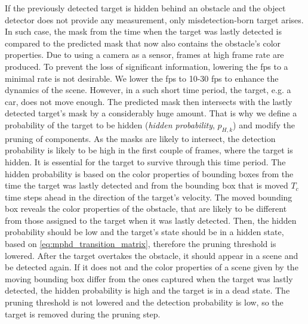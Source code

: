 If the previously detected target is hidden behind an obstacle and the object detector does not provide any
measurement, only misdetection-born target arises. In such case, the mask from the time when the target was lastly
detected is compared to the predicted mask that now also contains the obstacle's color properties. Due to using
a camera as
a sensor, frames at high frame rate are produced. To prevent the loss of significant information, lowering the fps to a minimal rate is not desirable. We lower the fps to 10-30 fps to enhance the dynamics of the scene. However, in a such short time
period, the target, e.g. a car, does not move enough. The predicted mask then intersects with the lastly
detected target's mask by a considerably huge amount. That is why we define \linebreak a probability of the target to be hidden (\textit{hidden probability}, $p_{H,k}$) and modify
the pruning of components. As the masks are likely to intersect, the detection probability is likely to be high in
the first couple of frames, where the target is hidden. It is essential for the target to survive through this time
period. The hidden probability is based on the color properties of bounding boxes from the time the target was lastly
detected
and from the bounding box that is moved $T_c$ time steps ahead in the direction of the target's velocity. The moved
bounding box reveals the color properties of the obstacle, that are likely to be different from those assigned to the
target
when it was lastly detected. Then, the hidden probability should be low and the target's state should be in a hidden
state,
based on \eqref{eq:mphd_transition_matrix}, therefore the pruning threshold is lowered. After the target overtakes the
obstacle,
it should appear in a scene and be detected again. If it does not and the color properties of a scene given by the
moving
bounding box differ from the ones captured when the target was lastly detected, the hidden probability is high and the
target is
in \linebreak a dead state. The pruning threshold is not lowered and the detection probability is low, so the target is removed
during the pruning step.
